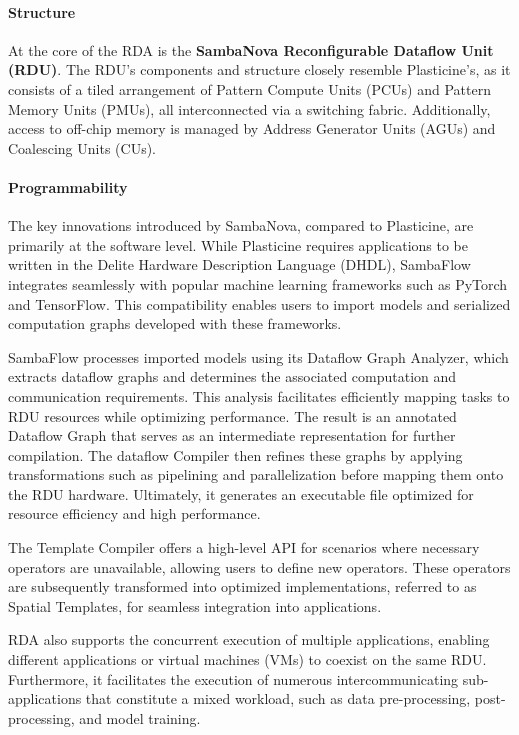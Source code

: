 \documentclass[conference]{IEEEtran}
\begin{document}
\paragraph{Structure}
At the core of the RDA is the \textbf{SambaNova Reconfigurable Dataflow Unit (RDU)}. The RDU's components and structure closely resemble Plasticine's, as it consists of a tiled arrangement of Pattern Compute Units (PCUs) and Pattern Memory Units (PMUs), all interconnected via a switching fabric. Additionally, access to off-chip memory is managed by Address Generator Units (AGUs) and Coalescing Units (CUs).
\paragraph{Programmability}
The key innovations introduced by SambaNova, compared to Plasticine, are primarily at the software level. While Plasticine requires applications to be written in the Delite Hardware Description Language (DHDL), SambaFlow integrates seamlessly with popular machine learning frameworks such as PyTorch and TensorFlow. This compatibility enables users to import models and serialized computation graphs developed with these frameworks.

SambaFlow processes imported models using its Dataflow Graph Analyzer, which extracts dataflow graphs and determines the associated computation and communication requirements. This analysis facilitates efficiently mapping tasks to RDU resources while optimizing performance. The result is an annotated Dataflow Graph that serves as an intermediate representation for further compilation. The dataflow Compiler then refines these graphs by applying transformations such as pipelining and parallelization before mapping them onto the RDU hardware. Ultimately, it generates an executable file optimized for resource efficiency and high performance.

The Template Compiler offers a high-level API for scenarios where necessary operators are unavailable, allowing users to define new operators. These operators are subsequently transformed into optimized implementations, referred to as Spatial Templates, for seamless integration into applications.

RDA also supports the concurrent execution of multiple applications, enabling different applications or virtual machines (VMs) to coexist on the same RDU. Furthermore, it facilitates the execution of numerous intercommunicating sub-applications that constitute a mixed workload, such as data pre-processing, post-processing, and model training.
\end{document}
